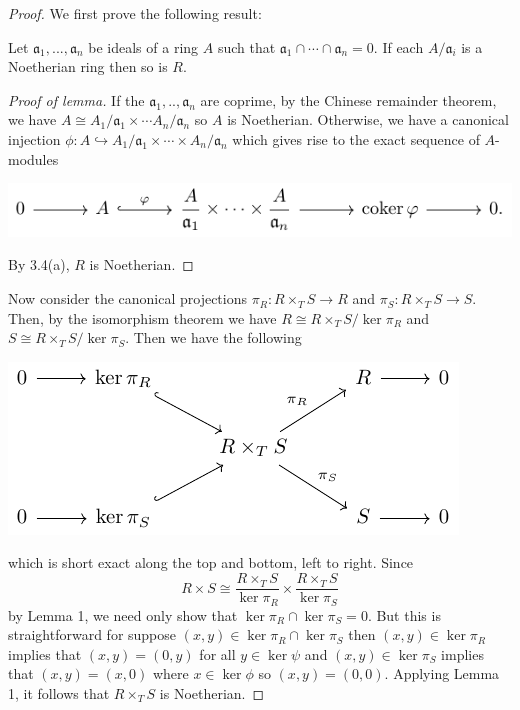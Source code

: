 \begin{proof}
We first prove the following result:
\begin{lemma}[Matsumura, Ex.\,3.1]
Let $\mathfrak{a}_1,...,\mathfrak{a}_n$ be ideals of a ring $A$
such that $\mathfrak{a}_1\cap\cdots\cap\mathfrak{a}_n=0$. If each
$A/\mathfrak{a}_i$ is a Noetherian ring then so is $R$.
\end{lemma}
\begin{proof}[Proof of lemma]
\renewcommand\qedsymbol{$\clubsuit$}
If the $\mathfrak{a}_1,..,\mathfrak{a}_n$ are coprime, by
the Chinese remainder theorem, we have $A\cong
A_1/\mathfrak{a}_1\times\cdots A_n/\mathfrak{a}_n$ so $A$ is
Noetherian. Otherwise, we have a canonical injection
$\phi\colon A\hookrightarrow A_1/\mathfrak{a}_1\times\cdots\times
A_n/\mathfrak{a}_n$ which gives rise to the exact sequence of
$A$-modules
\begin{center}
\includegraphics{figures/ps4-p2-short-exact-seq}
\end{center}
By 3.4(a), $R$ is Noetherian.
\end{proof}
Now consider the canonical projections $\pi_R\colon R\times_T
S\to R$ and $\pi_S\colon R\times_T S\to S$. Then, by the
isomorphism theorem we have $R\cong R\times_T S/\ker\pi_R$ and
$S\cong R\times_T S/\ker\pi_S$. Then we have the following
\begin{center}
\includegraphics{figures/ps4-p2-short-exact-seqs}
\end{center}
which is short exact along the top and bottom, left to
right. Since
\[
R\times S\cong \frac{R\times_T S}{\ker\pi_R}\times\frac{R\times_T S}{\ker\pi_S}
\]
by Lemma 1, we need only show that
$\ker\pi_R\cap\ker\pi_S=0$. But this is straightforward for
suppose $(x,y)\in\ker\pi_R\cap\ker\pi_S$ then $(x,y)\in\ker\pi_R$
implies that $(x,y)=(0,y)$ for all $y\in\ker\psi$ and
$(x,y)\in\ker\pi_S$ implies that $(x,y)=(x,0)$ where
$x\in\ker\phi$ so $(x,y)=(0,0)$. Applying Lemma 1, it follows
that $R\times_T S$ is Noetherian.
\end{proof}

